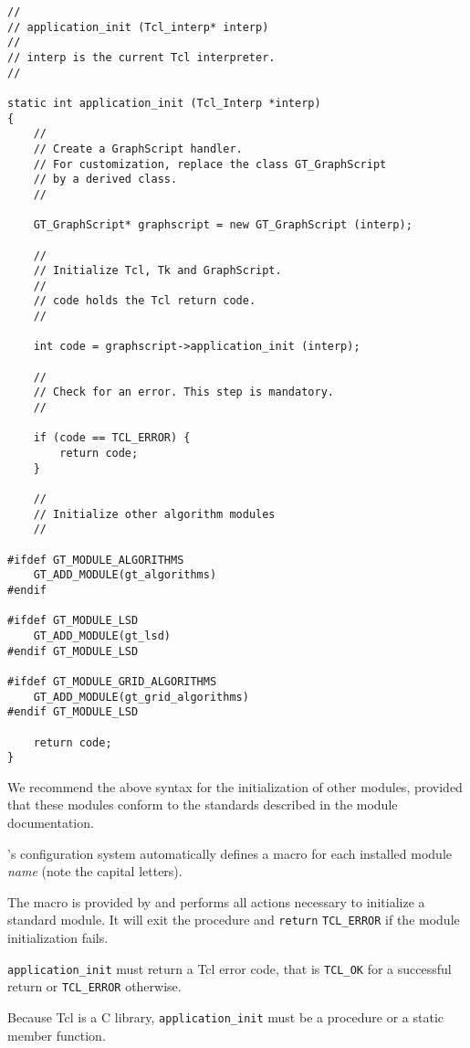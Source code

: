 \documentclass[twoside,fleqn]{report}
\begin{document}
\begin{verbatim}
//
// application_init (Tcl_interp* interp)
//
// interp is the current Tcl interpreter.
//

static int application_init (Tcl_Interp *interp)
{
    //
    // Create a GraphScript handler.
    // For customization, replace the class GT_GraphScript
    // by a derived class.
    //
    
    GT_GraphScript* graphscript = new GT_GraphScript (interp);
    
    //
    // Initialize Tcl, Tk and GraphScript.
    //
    // code holds the Tcl return code.
    //
    
    int code = graphscript->application_init (interp);

    //
    // Check for an error. This step is mandatory.
    //

    if (code == TCL_ERROR) {
        return code;
    }

    //
    // Initialize other algorithm modules
    //

#ifdef GT_MODULE_ALGORITHMS
    GT_ADD_MODULE(gt_algorithms)
#endif

#ifdef GT_MODULE_LSD
    GT_ADD_MODULE(gt_lsd)
#endif GT_MODULE_LSD
    
#ifdef GT_MODULE_GRID_ALGORITHMS
    GT_ADD_MODULE(gt_grid_algorithms)
#endif GT_MODULE_LSD
    
    return code;
}
\end{verbatim}


\begin{notes}

  \item We recommend the above syntax for the initialization of other 
  modules, provided that these modules conform to the standards 
  described in the module documentation.
  
  \item \Graphlet{}'s configuration system automatically defines a 
  macro  for each installed module \emph{name} 
  (note the capital letters).
  
  \item The macro  is provided by \Graphlet{} and 
  performs all actions necessary to initialize a standard module.  It 
  will exit the procedure and \texttt{return} \texttt{TCL\_ERROR} if 
  the module initialization fails.
  
  \item \texttt{application\_init} must return a Tcl error code, that 
  is \texttt{TCL\_OK} for a successful return or \texttt{TCL\_ERROR} 
  otherwise.
  
  \item Because Tcl is a C library, \texttt{application\_init} must be 
  a procedure or a static member function.
  
\end{notes}
\end{document}
